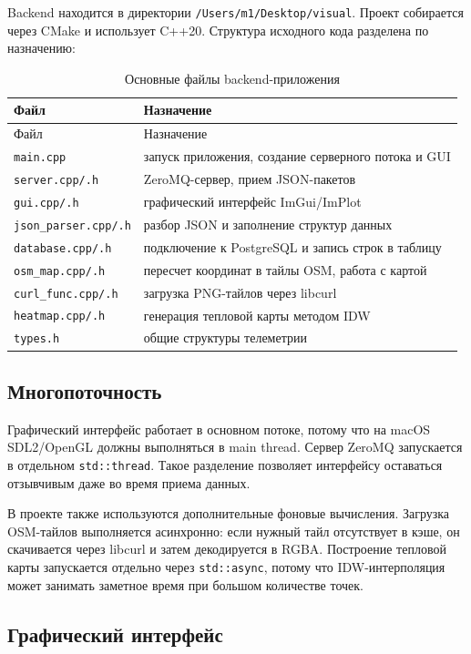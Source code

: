 \documentclass[14pt,a4paper]{extarticle}
\begin{document}
Backend находится в директории \texttt{/Users/m1/Desktop/visual}. Проект собирается через CMake и использует C++20. Структура исходного кода разделена по назначению:

\begin{longtable}{p{}p{}}
\caption{Основные файлы backend-приложения}\\
\toprule
Файл & Назначение \\
\midrule
\endfirsthead
\toprule
Файл & Назначение \\
\midrule
\endhead
\texttt{main.cpp} & запуск приложения, создание серверного потока и GUI \\
\texttt{server.cpp/.h} & ZeroMQ-сервер, прием JSON-пакетов \\
\texttt{gui.cpp/.h} & графический интерфейс ImGui/ImPlot \\
\texttt{json\_parser.cpp/.h} & разбор JSON и заполнение структур данных \\
\texttt{database.cpp/.h} & подключение к PostgreSQL и запись строк в таблицу \\
\texttt{osm\_map.cpp/.h} & пересчет координат в тайлы OSM, работа с картой \\
\texttt{curl\_func.cpp/.h} & загрузка PNG-тайлов через libcurl \\
\texttt{heatmap.cpp/.h} & генерация тепловой карты методом IDW \\
\texttt{types.h} & общие структуры телеметрии \\
\bottomrule
\end{longtable}

\subsection{Многопоточность}

Графический интерфейс работает в основном потоке, потому что на macOS SDL2/OpenGL должны выполняться в main thread. Сервер ZeroMQ запускается в отдельном \texttt{std::thread}. Такое разделение позволяет интерфейсу оставаться отзывчивым даже во время приема данных.

В проекте также используются дополнительные фоновые вычисления. Загрузка OSM-тайлов выполняется асинхронно: если нужный тайл отсутствует в кэше, он скачивается через libcurl и затем декодируется в RGBA. Построение тепловой карты запускается отдельно через \texttt{std::async}, потому что IDW-интерполяция может занимать заметное время при большом количестве точек.

\subsection{Графический интерфейс}
\end{document}
